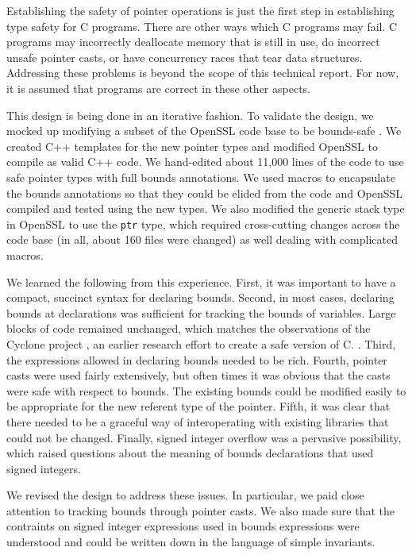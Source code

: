 Establishing the safety of pointer operations is just the first step in
establishing type safety for C programs. There are other ways which C
programs may fail. C programs may incorrectly deallocate memory that is
still in use, do incorrect unsafe pointer casts, or have concurrency
races that tear data structures. Addressing these problems is beyond the
scope of this technical report. For now, it is assumed that programs are
correct in these other aspects.

This design is being done in an iterative fashion.  To validate the
design, we mocked up modifying a subset of the OpenSSL 
code base \cite{OpenSSL2015} to be bounds-safe .  
We created C++ templates for the new pointer types and modified OpenSSL to 
compile as valid C++ code.
We hand-edited about 11,000 lines of the code to use safe pointer
types with full bounds annotations.  We used macros to encapsulate 
the bounds annotations so that they could be elided from the code
and OpenSSL compiled and tested using the new types.  We also modified the
generic stack type in OpenSSL to use the \texttt{ptr} type, which required
cross-cutting changes across the code base (in all, about 160 files were changed) 
as well dealing with complicated macros.   

We learned the following from this
experience.   First, it was important to have a compact, succinct syntax
for declaring bounds. 
Second, in most cases, declaring bounds at declarations was sufficient for 
tracking the bounds of variables.  Large blocks of code 
remained unchanged, which matches the observations of the
Cyclone project \cite{Jim2002}, an earlier research 
effort to create a safe version of C. .
Third, the expressions allowed in declaring
bounds needed to be rich.  Fourth, pointer casts were used
fairly extensively, but often times it was obvious that the casts were
safe with respect to bounds.  The existing bounds could be modified
easily to be appropriate for the new referent type of the pointer.
Fifth, it was clear that there needed
to be a graceful way of interoperating with existing libraries that could
not be changed.   Finally, signed integer overflow was a pervasive
possibility, which raised questions about the meaning of bounds 
declarations that used signed integers. 

We revised the design to
address these issues.  In particular, we paid close attention to
tracking bounds through pointer casts.  We also made sure that the
contraints on signed integer expressions used in bounds expressions
were understood and could be written down in the language of
simple invariants.

